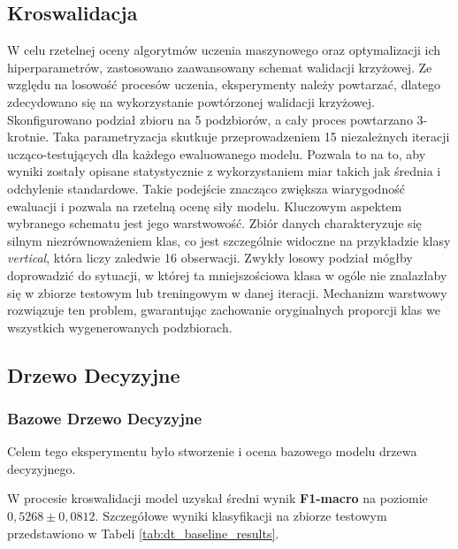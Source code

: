 \documentclass[12pt, a4paper]{article}
\begin{document}
\subsection{Kroswalidacja}
W celu rzetelnej oceny algorytmów uczenia maszynowego oraz optymalizacji ich hiperparametrów, zastosowano zaawansowany schemat walidacji krzyżowej. Ze względu na losowość procesów uczenia, eksperymenty należy powtarzać, dlatego zdecydowano się na wykorzystanie powtórzonej walidacji krzyżowej. Skonfigurowano podział zbioru na 5 podzbiorów, a cały proces powtarzano 3-krotnie. Taka parametryzacja skutkuje przeprowadzeniem 15 niezależnych iteracji ucząco-testujących dla każdego ewaluowanego modelu. Pozwala to na to, aby wyniki zostały opisane statystycznie z wykorzystaniem miar takich jak średnia i odchylenie standardowe. Takie podejście znacząco zwiększa wiarygodność ewaluacji i pozwala na rzetelną ocenę siły modelu. Kluczowym aspektem wybranego schematu jest jego warstwowość. Zbiór danych charakteryzuje się silnym niezrównoważeniem klas, co jest szczególnie widoczne na przykładzie klasy \textit{vertical}, która liczy zaledwie 16 obserwacji. Zwykły losowy podział mógłby doprowadzić do sytuacji, w której ta mniejszościowa klasa w ogóle nie znalazłaby się w zbiorze testowym lub treningowym w danej iteracji. Mechanizm warstwowy rozwiązuje ten problem, gwarantując zachowanie oryginalnych proporcji klas we wszystkich wygenerowanych podzbiorach.

\subsection{Drzewo Decyzyjne}

\subsubsection{Bazowe Drzewo Decyzyjne}

Celem tego eksperymentu było stworzenie i ocena bazowego modelu drzewa decyzyjnego.

W procesie kroswalidacji model uzyskał średni wynik \textbf{F1-macro} na poziomie $0{,}5268 \pm 0{,}0812$. Szczegółowe wyniki klasyfikacji na zbiorze testowym przedstawiono w Tabeli \ref{tab:dt_baseline_results}.
\end{document}
